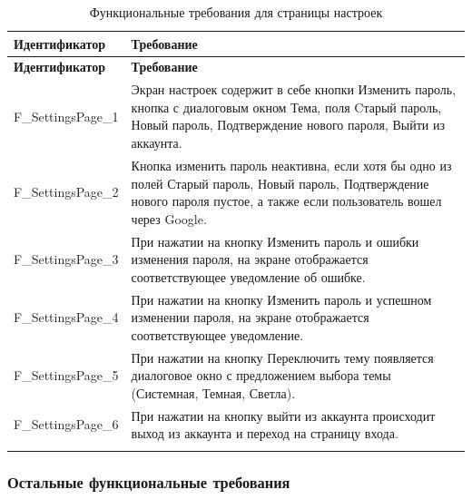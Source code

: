 \documentclass[a4paper, 14pt]{article}
\begin{document}
\begin{longtable}{| p{} | p{} |}
    \hline
    \textbf{Идентификатор}          & \textbf{Требование}                                                                                                                                                                \\
    \hline
    \endfirsthead
    \hline
    \textbf{Идентификатор}          & \textbf{Требование}                                                                                                                                                                \\
    \hline
    \endhead

    F\_SettingsPage\_1              & Экран настроек содержит в себе кнопки Изменить пароль, кнопка с диалоговым окном Тема, поля Cтарый пароль, Новый пароль, Подтверждение нового пароля, Выйти из аккаунта.                  \\ \hline
    F\_SettingsPage\_2              & Кнопка изменить пароль неактивна, если хотя бы одно из полей Старый пароль, Новый пароль, Подтверждение нового пароля пустое, а также если пользователь вошел через Google.        \\ \hline
    F\_SettingsPage\_3              & При нажатии на кнопку Изменить пароль и ошибки изменения пароля, на экране отображается соответствующее уведомление об ошибке.                                                     \\ \hline
    F\_SettingsPage\_4              & При нажатии на кнопку Изменить пароль и успешном изменении пароля, на экране отображается соответствующее уведомление.                                                             \\ \hline
    F\_SettingsPage\_5              & При нажатии на кнопку Переключить тему появляется диалоговое окно с предложением выбора темы (Системная, Темная, Светла).                                                                                               \\ \hline
    F\_SettingsPage\_6              & При нажатии на кнопку выйти из аккаунта происходит выход из аккаунта и переход на страницу входа.                                                                                   \\ \hline

    \caption{Функциональные требования для страницы настроек}
\end{longtable}

\subsubsection{Остальные функциональные требования}
\end{document}
